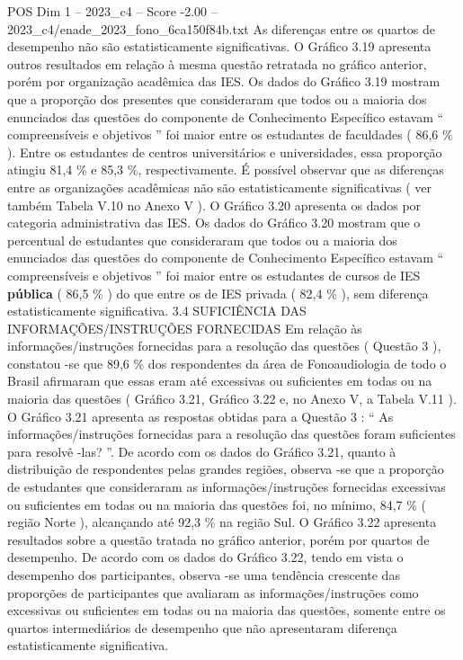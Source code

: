 \begin{textsample}{POS Dim 1 – 2023\_c4 – Score -2.00 – 2023\_c4/enade\_2023\_fono\_6ca150f84b.txt}
As diferenças entre os quartos de desempenho não são estatisticamente significativas.
O Gráfico 3.19 apresenta outros resultados em relação à mesma questão retratada no gráfico anterior, porém por organização acadêmica das IES.
Os dados do Gráfico 3.19 mostram que a proporção dos presentes que consideraram que todos ou a maioria dos enunciados das questões do componente de Conhecimento Específico estavam “ compreensíveis e objetivos ” foi maior entre os estudantes de faculdades ( 86,6 \% ).
Entre os estudantes de centros universitários e universidades, essa proporção atingiu 81,4 \% e 85,3 \%, respectivamente.
É possível observar que as diferenças entre as organizações acadêmicas não são estatisticamente significativas ( ver também Tabela V.10 no Anexo V ).
O Gráfico 3.20 apresenta os dados por categoria administrativa das IES.
Os dados do Gráfico 3.20 mostram que o percentual de estudantes que consideraram que todos ou a maioria dos enunciados das questões do componente de Conhecimento Específico estavam “ compreensíveis e objetivos ” foi maior entre os estudantes de cursos de IES \textbf{pública} ( 86,5 \% ) do que entre os de IES privada ( 82,4 \% ), sem diferença estatisticamente significativa. 3.4 SUFICIÊNCIA DAS INFORMAÇÕES/INSTRUÇÕES FORNECIDAS Em relação às informações/instruções fornecidas para a resolução das questões ( Questão 3 ), constatou -se que 89,6 \% dos respondentes da área de Fonoaudiologia de todo o Brasil afirmaram que essas eram até excessivas ou suficientes em todas ou na maioria das questões ( Gráfico 3.21, Gráfico 3.22 e, no Anexo V, a Tabela V.11 ).
O Gráfico 3.21 apresenta as respostas obtidas para a Questão 3 : “ As informações/instruções fornecidas para a resolução das questões foram suficientes para resolvê -las? ”.
De acordo com os dados do Gráfico 3.21, quanto à distribuição de respondentes pelas grandes regiões, observa -se que a proporção de estudantes que consideraram as informações/instruções fornecidas excessivas ou suficientes em todas ou na maioria das questões foi, no mínimo, 84,7 \% ( região Norte ), alcançando até 92,3 \% na região Sul.
O Gráfico 3.22 apresenta resultados sobre a questão tratada no gráfico anterior, porém por quartos de desempenho.
De acordo com os dados do Gráfico 3.22, tendo em vista o desempenho dos participantes, observa -se uma tendência crescente das proporções de participantes que avaliaram as informações/instruções como excessivas ou suficientes em todas ou na maioria das questões, somente entre os quartos intermediários de desempenho que não apresentaram diferença estatisticamente significativa.

\end{textsample}
